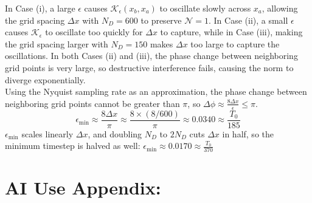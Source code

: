 \documentclass[11pt]{article}
\begin{document}
\setlength{\parindent}{0pt} In Case (i), a large $\epsilon$ causes $\mathcal{K}_\epsilon(x_b, x_a)$ to oscillate slowly across $x_a$, allowing the grid spacing $\Delta x$ with $N_D = 600$ to preserve $\mathcal{N} = 1$. In Case (ii), a small $\epsilon$ causes $\mathcal{K}_\epsilon$ to oscillate too quickly for $\Delta x$ to capture, while in Case (iii), making the grid spacing larger with $N_D = 150$ makes $\Delta x$ too large to capture the oscillations. In both Cases (ii) and (iii), the phase change between neighboring grid points is very large, so destructive interference fails, causing the norm to diverge exponentially. \\
Using the Nyquist sampling rate as an approximation, the phase change between neighboring grid points cannot be greater than $\pi$, so $\Delta \phi \approx \frac{8 \Delta x}{\epsilon} \le \pi$.
   $$\epsilon_{\min} \approx \frac{8 \Delta x}{\pi} \approx \frac{8 \times (8 / 600)}{\pi} \approx 0.0340 \approx \frac{T_0}{185}$$
$\epsilon_{\min}$ scales linearly $\Delta x$, and doubling $N_D$ to $2N_D$ cuts $\Delta x$ in half, so the minimum timestep is halved as well: $\epsilon_{\min} \approx 0.0170 \approx \frac{T_0}{370}$

\section*{AI Use Appendix:}
\end{document}
